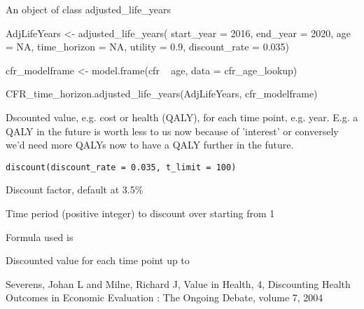 \documentclass[a4paper]{book}
\begin{document}
%
\begin{Value}
An object of class adjusted\_life\_years
\end{Value}
%
\begin{Examples}
\begin{ExampleCode}

AdjLifeYears <- adjusted_life_years(
                    start_year = 2016,
                    end_year = 2020,
                    age = NA,
                    time_horizon = NA,
                    utility = 0.9,
                    discount_rate = 0.035)

cfr_modelframe <- model.frame(cfr ~ age, data = cfr_age_lookup)

CFR_time_horizon.adjusted_life_years(AdjLifeYears, cfr_modelframe)

\end{ExampleCode}
\end{Examples}
%
\begin{Description}\relax
Dscounted value, e.g. cost or health (QALY), for each time point, e.g. year.
E.g. a QALY in the future is worth less to us now because of 'interest'
or conversely we'd need more QALYs now to have a QALY further in the future.
\end{Description}
%
\begin{Usage}
\begin{verbatim}
discount(discount_rate = 0.035, t_limit = 100)
\end{verbatim}
\end{Usage}
%
\begin{Arguments}
\begin{ldescription}
\item[\code{discount\_rate}] Discount factor, default at 3.5\%

\item[\code{t\_limit}] Time period (positive integer) to discount over starting from 1
\end{ldescription}
\end{Arguments}
%
\begin{Details}\relax
Formula used is
\end{Details}
%
\begin{Value}
Discounted value for each time point up to 
\end{Value}
%
\begin{References}\relax
Severens, Johan L and Milne, Richard J,
Value in Health, 4, Discounting Health Outcomes in Economic Evaluation : The Ongoing Debate,
volume 7, 2004
\end{References}
\end{document}
